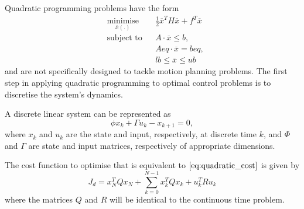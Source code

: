 \par Quadratic programming problems \cite{frank1956algorithm} have the form
\begin{equation}
    \label{eq:gen_quad_prog}
    \begin{aligned}
    & \underset{\overline{x}(.)}{\text{minimise}} && \frac{1}{2} \overline{x}^T H \overline{x} + f^T \overline{x}  \\
    & \text{subject to} && A \cdot \overline{x} \leq b, \\
    & && Aeq \cdot \overline{x} = beq, \\
    & && lb \leq \overline{x} \leq ub
    \end{aligned}
\end{equation} 
and are not specifically designed to tackle motion planning problems. The first step in applying quadratic programming to optimal control problems is to discretise the system's dynamics. 
\par A discrete linear system can be represented as
\begin{equation}
    \label{eq:discrete_state_space} 
    \phi x_k + \Gamma u_k - x_{k+1} = 0,
\end{equation}
where $x_k$ and $u_k$ are the state and input, respectively, at discrete time $k$, and $\Phi$ and $\Gamma$ are state and input matrices, respectively of appropriate dimensions.
\par The cost function to optimise that is equivalent to $\ref{eq:quadratic_cost}$ is given by
\begin{equation}
    J_d = x_N^T Q x_N + \sum_{k=0}^{N-1} x_k^T Q x_k + u_k^T R u_k
    \label{eq:discrete_quad_cost}
\end{equation}
where the matrices $Q$ and $R$ will be identical to the continuous time problem.

